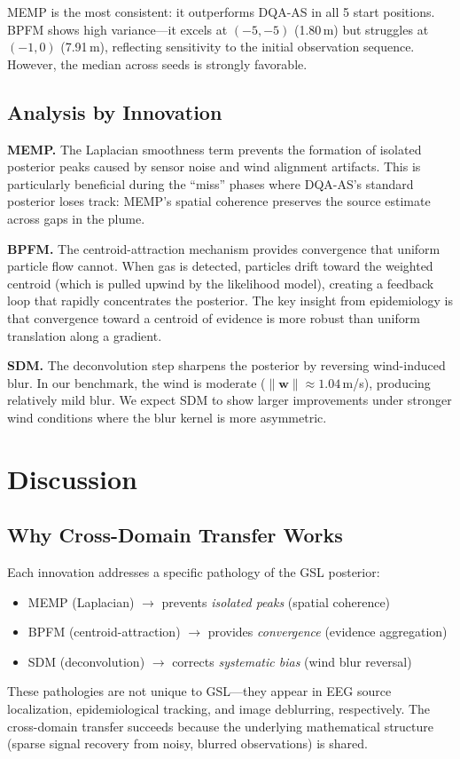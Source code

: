 \documentclass[conference]{IEEEtran}
\begin{document}
MEMP is the most consistent: it outperforms DQA-AS in all 5 start positions.
BPFM shows high variance---it excels at $(-5,-5)$ (1.80\,m) but struggles at $(-1,0)$ (7.91\,m), reflecting sensitivity to the initial observation sequence.
However, the median across seeds is strongly favorable.

\subsection{Analysis by Innovation}

\textbf{MEMP.} The Laplacian smoothness term prevents the formation of isolated posterior peaks caused by sensor noise and wind alignment artifacts.
This is particularly beneficial during the ``miss'' phases where DQA-AS's standard posterior loses track: MEMP's spatial coherence preserves the source estimate across gaps in the plume.

\textbf{BPFM.} The centroid-attraction mechanism provides convergence that uniform particle flow cannot.
When gas is detected, particles drift toward the weighted centroid (which is pulled upwind by the likelihood model), creating a feedback loop that rapidly concentrates the posterior.
The key insight from epidemiology is that convergence toward a centroid of evidence is more robust than uniform translation along a gradient.

\textbf{SDM.} The deconvolution step sharpens the posterior by reversing wind-induced blur.
In our benchmark, the wind is moderate ($\|\mathbf{w}\| \approx 1.04$\,m/s), producing relatively mild blur.
We expect SDM to show larger improvements under stronger wind conditions where the blur kernel is more asymmetric.

\section{Discussion}

\subsection{Why Cross-Domain Transfer Works}
Each innovation addresses a specific pathology of the GSL posterior:
\begin{itemize}
    \item MEMP (Laplacian) $\to$ prevents \emph{isolated peaks} (spatial coherence)
    \item BPFM (centroid-attraction) $\to$ provides \emph{convergence} (evidence aggregation)
    \item SDM (deconvolution) $\to$ corrects \emph{systematic bias} (wind blur reversal)
\end{itemize}
These pathologies are not unique to GSL---they appear in EEG source localization, epidemiological tracking, and image deblurring, respectively.
The cross-domain transfer succeeds because the underlying mathematical structure (sparse signal recovery from noisy, blurred observations) is shared.
\end{document}
